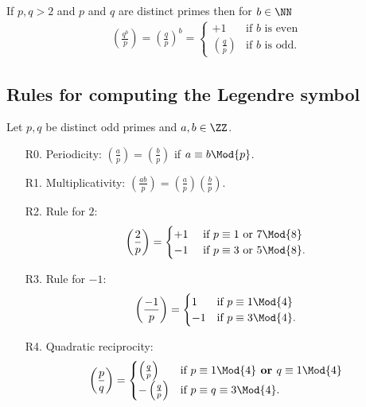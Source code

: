 \documentclass[12pt, a4paper]{article}
\begin{document}
\begin{mdthm}
    If \(p,q>2\) and \(p\) and \(q\) are distinct primes then for \(b \in \NN\)
    \[\begin{aligned}
        \left( \frac{q^b}{p} \right) = \left( \frac{q}{p} \right)^b = \begin{cases}
            +1 &\text{if } b \text{ is even}\\
            \left( \frac{q}{p} \right) &\text{if } b \text{ is odd.}
        \end{cases}
    \end{aligned}\]
\end{mdthm}

\subsection{Rules for computing the Legendre symbol}

\begin{mdthm}
    Let \(p,q\) be distinct odd primes and \(a,b \in \ZZ\).
    \begin{enumerate}
        \item[R0.] Periodicity: \(\left( \frac{a}{p} \right) = \left( \frac{b}{p} \right)\) if \(a \equiv b \Mod{p}\).
        \item[R1.] Multiplicativity: \(\left( \frac{ab}{p} \right) =\left( \frac{a}{p} \right) \left( \frac{b}{p} \right)\).
        \item[R2.] Rule for \(2\):
        \[\begin{aligned}
            \left( \frac{2}{p} \right)  = \begin{cases}
                +1 &\text{ if } p\equiv 1 \text{ or } 7 \Mod{8} \\
                -1 &\text{ if } p\equiv 3 \text{ or } 5 \Mod{8}.
            \end{cases}
        \end{aligned}\]
        \item[R3.] Rule for \(-1\):
        \[\begin{aligned}
            \left( \frac{-1}{p} \right)  = 
            \begin{cases}
                1 & \text{if } p \equiv 1 \Mod{4} \\
                -1 & \text{if } p \equiv 3 \Mod{4}.
            \end{cases}
        \end{aligned}\]
        \item[R4.] Quadratic reciprocity:
        \[\begin{aligned}
            \left( \frac{p}{q} \right) = 
            \begin{cases}
                \left( \frac{q}{p} \right) &\text{if } p \equiv 1 \Mod{4} \textbf{ or } q \equiv 1 \Mod{4} \\
                -\left( \frac{q}{p} \right) &\text{if } p \equiv q \equiv 3 \Mod{4}.
            \end{cases}
        \end{aligned}\]
    \end{enumerate}
\end{mdthm}
\end{document}
